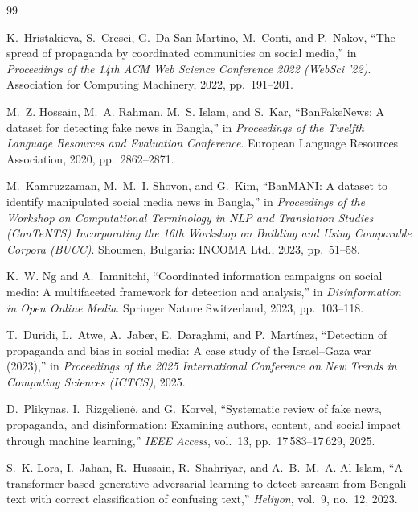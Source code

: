 \documentclass[12pt,a4paper]{report}
\begin{document}
\clearpage
{}
{}
\begin{thebibliography}{99}
\setlength{\itemsep}{3pt}

 K.~Hristakieva, S.~Cresci, G.~Da San Martino, M.~Conti, and P.~Nakov, ``The spread of propaganda by coordinated communities on social media,'' in \emph{Proceedings of the 14th ACM Web Science Conference 2022 (WebSci '22)}. Association for Computing Machinery, 2022, pp.~191--201.

 M.~Z. Hossain, M.~A. Rahman, M.~S. Islam, and S.~Kar, ``BanFakeNews: A dataset for detecting fake news in Bangla,'' in \emph{Proceedings of the Twelfth Language Resources and Evaluation Conference}. European Language Resources Association, 2020, pp.~2862--2871.

 M.~Kamruzzaman, M.~M.~I. Shovon, and G.~Kim, ``BanMANI: A dataset to identify manipulated social media news in Bangla,'' in \emph{Proceedings of the Workshop on Computational Terminology in NLP and Translation Studies (ConTeNTS) Incorporating the 16th Workshop on Building and Using Comparable Corpora (BUCC)}. Shoumen, Bulgaria: INCOMA Ltd., 2023, pp.~51--58.

 K.~W. Ng and A.~Iamnitchi, ``Coordinated information campaigns on social media: A multifaceted framework for detection and analysis,'' in \emph{Disinformation in Open Online Media}. Springer Nature Switzerland, 2023, pp.~103--118.

 T.~Duridi, L.~Atwe, A.~Jaber, E.~Daraghmi, and P.~Mart\'inez, ``Detection of propaganda and bias in social media: A case study of the Israel--Gaza war (2023),'' in \emph{Proceedings of the 2025 International Conference on New Trends in Computing Sciences (ICTCS)}, 2025.

 D.~Plikynas, I.~Rizgelien\.e, and G.~Korvel, ``Systematic review of fake news, propaganda, and disinformation: Examining authors, content, and social impact through machine learning,'' \emph{IEEE Access}, vol.~13, pp.~17\,583--17\,629, 2025.

 S.~K. Lora, I.~Jahan, R.~Hussain, R.~Shahriyar, and A.~B.~M.~A. Al Islam, ``A transformer-based generative adversarial learning to detect sarcasm from Bengali text with correct classification of confusing text,'' \emph{Heliyon}, vol.~9, no.~12, 2023.


\end{thebibliography}
\end{document}
